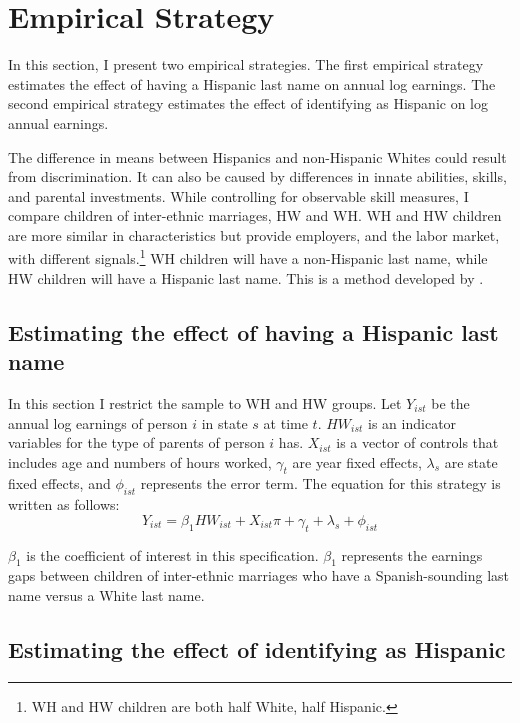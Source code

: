 \documentclass[12pt,english]{article}
\begin{document}
\section{Empirical Strategy}\label{sec:emp_model}

In this section, I present two empirical strategies. The first empirical strategy estimates the effect of having a Hispanic last name on annual log earnings. The second empirical strategy estimates the effect of identifying as Hispanic on log annual earnings.

The difference in means between Hispanics and non-Hispanic Whites could result from discrimination. It can also be caused by differences in innate abilities, skills, and parental investments. While controlling for observable skill measures, I compare children of inter-ethnic marriages, HW and WH. WH and HW children are more similar in characteristics but provide employers, and the labor market, with different signals.\footnote{WH and HW children are both half White, half Hispanic.} WH children will have a non-Hispanic last name, while HW children will have a Hispanic last name. This is a method developed by \textcite{rubinstein2014pride}.

\subsection{Estimating the effect of having a Hispanic last name}

In this section I restrict the sample to WH and HW groups. Let $Y_{ist}$ be the annual log earnings of person $i$ in state $s$ at time $t$. $HW_{ist}$ is an indicator variables for the type of parents of person $i$ has. $X_{ist}$ is a vector of controls that includes age and numbers of hours worked, $\gamma_{t}$ are year fixed effects, $\lambda_{s}$ are state fixed effects, and $\phi_{ist}$ represents the error term. The equation for this strategy is written as follows:
\begin{equation} \label{eq:1a}
Y_{ist} = \beta_{1} HW_{ist} + X_{ist} \pi + \gamma_{t} + \lambda_s + \phi_{ist}
\end{equation}

$\beta_{1}$ is the coefficient of interest in this specification. $\beta_{1}$ represents the earnings gaps between children of inter-ethnic marriages who have a Spanish-sounding last name versus a White last name. 

\subsection{Estimating the effect of identifying as Hispanic}
\end{document}
